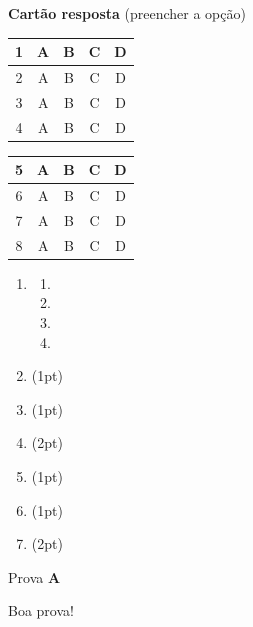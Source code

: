 \documentclass[a4paper]{article}
\begin{document}
\begin{multicols}{2}
{\bf Cartão resposta} (preencher a opção)

\begin{tabular}[!b]{|c|c|c|c|c|}
  \hline
  1 & A & B & C & D\\
  \hline
  2 & A & B & C & D\\
  \hline
  3 & A & B & C & D\\
  \hline
  4& A & B & C & D\\
  \hline
\end{tabular}
\begin{tabular}[!b]{|c|c|c|c|c|}
  \hline
  5 & A & B & C & D\\
  \hline
  6 & A & B & C & D\\
  \hline
  7& A & B & C & D\\
  \hline
  8 & A & B & C & D\\
  \hline
\end{tabular}

\begin{enumerate}
\item 
  \begin{enumerate}
  \item
  \item
  \item
  \item 
  \end{enumerate}

\vspace{0.1cm}

\item (1pt) 

\vspace{2cm}
\item (1pt) 

\vspace{3cm}
\item (2pt) 

\vspace{4cm}
\item (1pt) 

\vspace{3cm}

\item (1pt) 

\vspace{5cm}
\item (2pt) 


\vfill
\end{enumerate}
\end{multicols}

\newpage
{\hfill Prova {\bf A}\par}

\vfill
\begin{center}Boa prova!\end{center}
\end{document}

